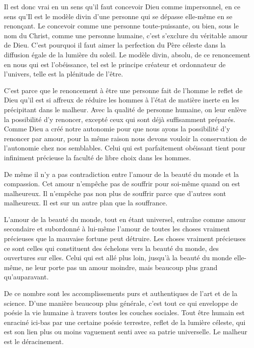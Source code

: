 \documentclass[french,twoside]{book} %
\begin{document}
Il est donc vrai en un sens qu'il faut concevoir Dieu comme impersonnel, en ce sens qu'Il est le modèle divin d'une personne qui se dépasse elle-même en se renonçant. Le concevoir comme une personne toute-puissante, ou bien, sous le nom du Christ, comme une personne humaine, c'est s'exclure du véritable amour de Dieu. C'est pourquoi il faut aimer la perfection du Père céleste dans la diffusion égale de la lumière du soleil. Le modèle divin, absolu, de ce renoncement en nous qui est l'obéissance, tel est le principe créateur et ordonnateur de l'univers, telle est la plénitude de l'être.\par
C'est parce que le renoncement à être une personne fait de l'homme le reflet de Dieu qu'il est si affreux de réduire les hommes à l'état de matière inerte en les précipitant dans le malheur. Avec la qualité de personne humaine, on leur enlève la possibilité d'y renoncer, excepté ceux qui sont déjà suffisamment préparés. Comme Dieu a créé notre autonomie pour que nous ayons la possibilité d'y renoncer par amour, pour la même raison nous devons vouloir la conservation de l'autonomie chez nos semblables. Celui qui est parfaitement obéissant tient pour infiniment précieuse la faculté de libre choix dans les hommes.\par
De même il n'y a pas contradiction entre l'amour de la beauté du monde et la compassion. Cet amour n'empêche pas de souffrir pour soi-même quand on est malheureux. Il n'empêche pas non plus de souffrir parce que d'autres sont malheureux. Il est sur un autre plan que la souffrance.\par
L'amour de la beauté du monde, tout en étant universel, entraîne comme amour secondaire et subordonné à lui-même l'amour de toutes les choses vraiment précieuses que la mauvaise fortune peut détruire. Les choses vraiment précieuses ce sont celles qui constituent des échelons vers la beauté du monde, des ouvertures sur elles. Celui qui est allé plus loin, jusqu'à la beauté du monde elle-même, ne leur porte pas un amour moindre, mais beaucoup plus grand qu'auparavant.\par
De ce nombre sont les accomplissements purs et authentiques de l'art et de la science. D'une manière beaucoup plus générale, c'est tout ce qui enveloppe de poésie la vie humaine à travers toutes les couches sociales. Tout être humain est enraciné ici-bas par une certaine poésie terrestre, reflet de la lumière céleste, qui est son lien plus ou moins vaguement senti avec sa patrie universelle. Le malheur est le déracinement.\par
\end{document}
